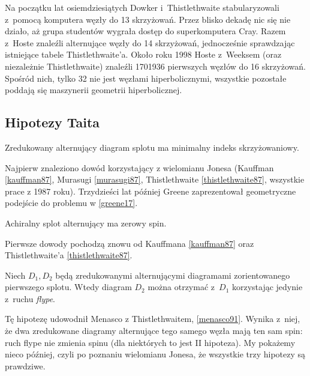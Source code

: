 {Na początku lat osiemdziesiątych Dowker i~Thistlethwaite stabularyzowali z~pomocą komputera węzły do 13 skrzyżowań.
Przez blisko dekadę nic się nie działo, aż grupa studentów wygrała dostęp do superkomputera Cray.
Razem z~Hoste znaleźli alternujące węzły do 14 skrzyżowań, jednocześnie sprawdzając istniejące tabele Thistlethwaite'a.
Około roku 1998 Hoste z~Weeksem (oraz niezależnie Thistlethwaite) znaleźli 1701936 pierwszych węzłów do 16 skrzyżowań.
Spośród nich, tylko 32 nie jest węzłami hiperbolicznymi, wszystkie pozostałe poddają się maszynerii geometrii hiperbolicznej.

\subsection{Hipotezy Taita}
\begin{conjecture}
    \label{conj_tait_i}
    Zredukowany alternujący diagram splotu ma minimalny indeks skrzyżowaniowy.
\end{conjecture}

Najpierw znaleziono dowód korzystający z wielomianu Jonesa (Kauffman \ref{kauffman87}, Murasugi \ref{murasugi87}, Thistlethwaite \ref{thistlethwaite87}, wszystkie prace z 1987 roku).
Trzydzieści lat później Greene zaprezentował geometryczne podejście do problemu w \ref{greene17}.

\begin{conjecture}
    \label{conj_tait_ii}
    Achiralny splot alternujący ma zerowy spin.
\end{conjecture}

Pierwsze dowody pochodzą znowu od Kauffmana \ref{kauffman87} oraz Thistlethwaite'a \ref{thistlethwaite87}.

\begin{conjecture}
    \label{conj_tait_iii}
    Niech $D_1, D_2$ będą zredukowanymi alternującymi diagramami zorientowanego pierwszego splotu.
    Wtedy diagram $D_2$ można otrzymać z~$D_1$ korzystając jedynie z~ruchu \emph{flype}.
\end{conjecture}

Tę hipotezę udowodnił Menasco z Thistlethwaitem, \ref{menasco91}.
Wynika z~niej, że dwa zredukowane diagramy alternujące tego samego węzła mają ten sam spin: ruch flype nie zmienia spinu (dla niektórych to jest II hipoteza).	
My pokażemy nieco później, czyli po poznaniu wielomianu Jonesa, że wszystkie trzy hipotezy są prawdziwe.

}
